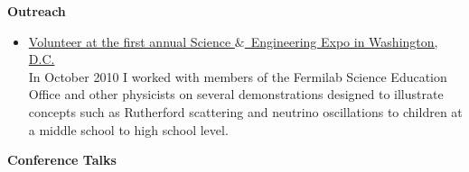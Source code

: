 \documentclass[12pt]{article}
\begin{document}
\begin{singlespace}


\noindent
{\Large \textbf{Outreach}}
\begin{itemize}
\item{\underline{Volunteer at the first annual Science $\&$~Engineering Expo in Washington, D.C.} \\ In October 2010 I worked with members of the Fermilab Science Education Office and other physicists on several demonstrations designed to illustrate concepts such as Rutherford scattering and neutrino oscillations to children at a middle school to high school level.}
\end{itemize}




\end{singlespace}
%








\clearpage
\noindent
{\Large \textbf{Conference Talks}}
\end{document}
